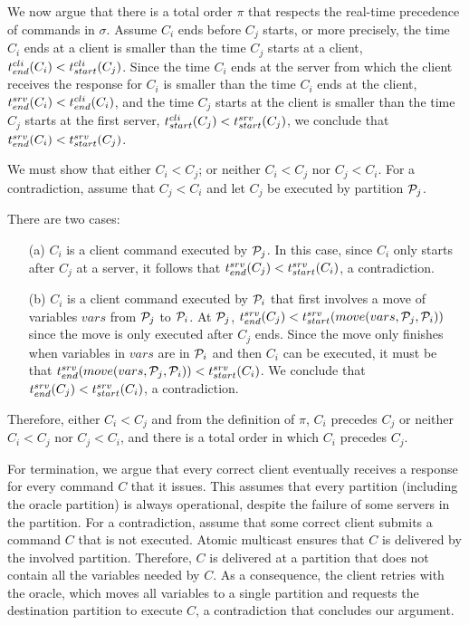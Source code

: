 %
We now argue that there is a total order $\pi$ that respects the real-time precedence of commands in $\sigma$.
Assume $C_i$ ends before $C_j$ starts, or more precisely, the time $C_i$ ends at a client is smaller than the time $C_j$ starts at a client, $t^{cli}_{end}(C_i) < t^{cli}_{start}(C_j)$.
Since the time $C_i$ ends at the server from which the client receives the response for $C_i$ is smaller than the time $C_i$ ends at the client, $t^{srv}_{end}(C_i) < t^{cli}_{end}(C_i)$, and the time $C_j$ starts at the client is smaller than the time $C_j$ starts at the first server, $t^{cli}_{start}(C_j) < t^{srv}_{start}(C_j)$, we conclude that $t^{srv}_{end}(C_i) < t^{srv}_{start}(C_j)$.

We must show that either $C_i < C_j$; or neither $C_i < C_j$ nor $C_j < C_i$.
For a contradiction, assume that $C_j <  C_i$ and let $C_j$ be executed by partition $\mathcal{P}_j$.

There are two cases: 
\begin{enumerate}
\item[(a)] $C_i$ is a client command executed by $\mathcal{P}_j$.
In this case, since $C_i$ only starts after $C_j$ at a server, it follows that $t^{srv}_{end}(C_j) < t^{srv}_{start}(C_i)$, a contradiction.
\item[(b)] $C_i$ is a client command executed by $\mathcal{P}_i$ that first involves a move of variables $vars$ from $\mathcal{P}_j$ to $\mathcal{P}_i$.
At $\mathcal{P}_j$, $t^{srv}_{end}(C_j) < t^{srv}_{start}(move(vars,\mathcal{P}_j,\mathcal{P}_i))$ since the move is only executed after $C_j$ ends.
Since the move only finishes when variables in $vars$ are in $\mathcal{P}_i$ and then $C_i$ can be executed, it must be that
$t^{srv}_{end}(move(vars,\mathcal{P}_j,\mathcal{P}_i)) < t^{srv}_{start}(C_i)$.
We conclude that $t^{srv}_{end}(C_j) < t^{srv}_{start}(C_i)$, a contradiction.
\end{enumerate}
Therefore, either $C_i < C_j$ and from the definition of $\pi$, $C_i$ precedes $C_j$ or neither $C_i < C_j$ nor $C_j < C_i$, and there is a total order in which $C_i$ precedes $C_j$.

For termination, we argue that every correct client eventually receives a response for every command $C$ that it issues.
This assumes that every partition (including the oracle partition) is always operational, despite the failure of some servers in the partition.
For a contradiction, assume that some correct client submits a command $C$ that is not executed.
Atomic multicast ensures that $C$ is delivered by the involved partition.
Therefore, $C$ is delivered at a partition that does not contain all the variables needed by $C$.
As a consequence, the client retries with the oracle, which moves all variables to a single partition and requests the destination partition to execute $C$, a contradiction that concludes our argument.


